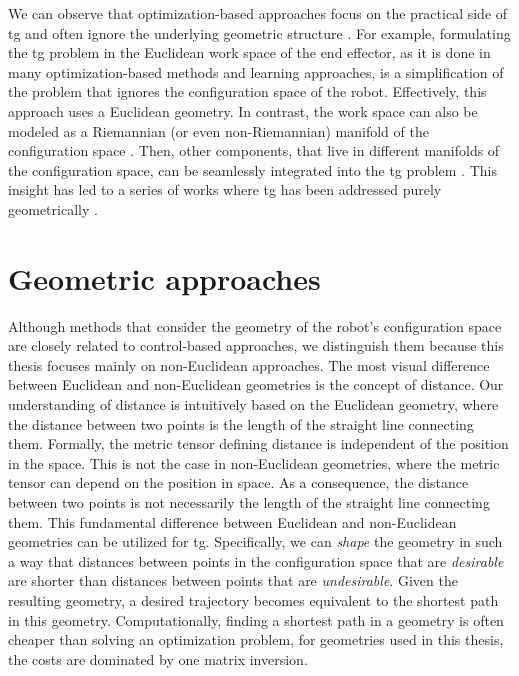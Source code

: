 We can observe that optimization-based approaches focus on
the practical side of \ac{tg} and often ignore the
underlying geometric structure \cite{Ratliff2015}. For
example, formulating the \ac{tg} problem in the Euclidean
work space of the end effector, as it is done in many
optimization-based methods and learning approaches, is a
simplification of the problem that ignores the configuration
space of the robot. Effectively, this approach uses a
Euclidean geometry. In contrast, the work space can also be
modeled as a Riemannian (or even non-Riemannian) manifold of
the configuration space \cite{klein2023design}. Then, other
components, that live in different manifolds of the
configuration space, can be seamlessly integrated into the
\ac{tg} problem \cite{Ratliff2015}. This insight has led to
a series of works where \ac{tg} has been addressed
purely geometrically
\cite{Ratliff2015,Ratliff2018,Cheng2020,Cheng2020a,Ratliff2020,Xie2020}.

\section{Geometric approaches}
\label{sec:geometries_in_trajectory_generation}

Although methods that consider the geometry of the robot's 
configuration space are closely related to control-based
approaches, we distinguish them because this thesis focuses
mainly on non-Euclidean approaches. 
The most visual
difference between Euclidean and non-Euclidean geometries is
the concept of distance. Our understanding of distance is 
intuitively based on the Euclidean geometry, where the
distance between two points is the length of the straight
line connecting them. Formally, the metric tensor defining
distance is independent of the position in the space. This
is not the case in non-Euclidean geometries, where the
metric tensor can depend on the position in space.
As a consequence, the distance between two points is not
necessarily the length of the straight line connecting them.
This fundamental difference between Euclidean and
non-Euclidean geometries can be utilized for \ac{tg}.
Specifically, we can \textit{shape} the geometry in such a
way that distances between points in the configuration space
that are \textit{desirable} are shorter than distances
between points that are \textit{undesirable}. Given the
resulting geometry, a desired trajectory becomes
equivalent to the shortest path in this geometry.
Computationally, finding a shortest path in a geometry is 
often cheaper than solving an optimization problem, for
geometries used in this thesis, the costs are dominated by
one matrix inversion.

